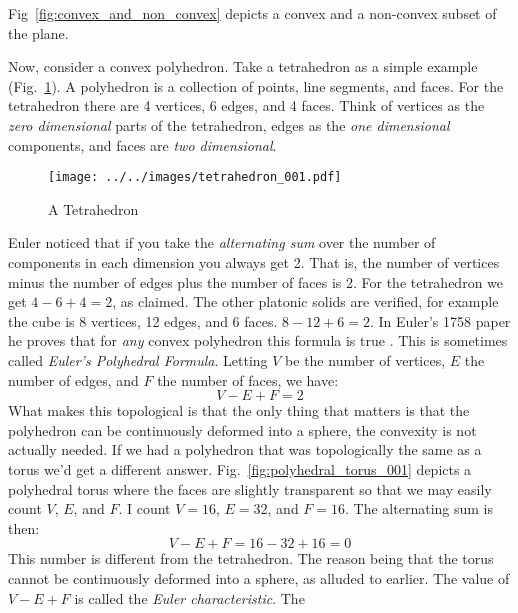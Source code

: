     Fig~\ref{fig:convex_and_non_convex} depicts a convex and a non-convex
    subset of the plane.
    \par\hfill\par
    Now, consider a convex polyhedron. Take a tetrahedron as a simple
    example (Fig.~\ref{fig:tetrahedron_001}). A polyhedron is a collection of
    points, line segments, and faces. For the tetrahedron there are 4 vertices,
    6 edges, and 4 faces. Think of vertices as the
    \textit{zero dimensional} parts of the tetrahedron, edges as the
    \textit{one dimensional} components, and faces are \textit{two dimensional}.
    \begin{figure}[H]
        \centering
        \texttt{[image: ../../images/tetrahedron\_001.pdf]}
        \caption{A Tetrahedron}
        \label{fig:tetrahedron_001}
    \end{figure}
    Euler noticed that if you take the \textit{alternating sum} over the number
    of components in each dimension you always get 2. That is, the number of
    vertices minus the number of edges plus the number of faces is 2. For the
    tetrahedron we get $4-6+4=2$, as claimed. The other platonic solids are
    verified, for example the cube is 8 vertices, 12 edges, and 6 faces.
    $8-12+6=2$. In Euler's 1758 paper he proves that for \textit{any} convex
    polyhedron this formula is true \cite{LeonhardEulerPolyhedraFormula}. This
    is sometimes called \textit{Euler's Polyhedral Formula}. Letting $V$ be the
    number of vertices, $E$ the number of edges, and $F$ the number of faces,
    we have:
    \begin{equation}
        V-E+F=2
    \end{equation}
    What makes this topological is that the only thing that matters is that the
    polyhedron can be continuously deformed into a sphere, the convexity is not
    actually needed. If we had a polyhedron that was topologically the same as
    a torus we'd get a different answer.
    Fig.~\ref{fig:polyhedral_torus_001} depicts a polyhedral torus where the
    faces are slightly transparent so that we may easily count $V$, $E$, and
    $F$. I count $V=16$, $E=32$, and $F=16$. The alternating sum is then:
    \begin{equation}
        V-E+F=16-32+16=0
    \end{equation}
    This number is different from the tetrahedron. The reason being that the
    torus cannot be continuously deformed into a sphere, as alluded to earlier.
    The value of $V-E+F$ is called the \textit{Euler characteristic}. The
